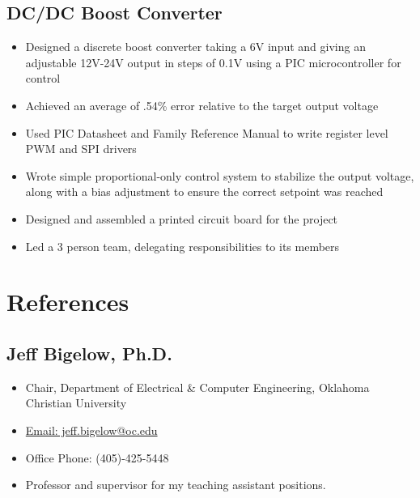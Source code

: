 \documentclass{article}
\begin{document}
\begin{spacing}{.5}
	\subsection{DC/DC Boost Converter \hfill {}}
		\begin{itemize}[label=--,itemsep=-.35ex]
			\item \large{Designed a discrete boost converter taking a 6V input and giving an adjustable 12V-24V output in steps of 0.1V using a PIC microcontroller for control}
			\item \large{Achieved an average of .54\% error relative to the target output voltage}
			\item \large{Used PIC Datasheet and Family Reference Manual to write register level PWM and SPI drivers}
			\item \large{Wrote simple proportional-only control system to stabilize the output voltage, along with a bias adjustment to ensure the correct setpoint was reached}
			\item \large{Designed and assembled a printed circuit board for the project}
			\item \large{Led a 3 person team, delegating responsibilities to its members}
		\end{itemize}

\section{References}
	\subsection{Jeff Bigelow, Ph.D.}
		\begin{itemize}[label=--,itemsep=-.35ex]
			\item \large{Chair, Department of Electrical \& Computer Engineering, Oklahoma Christian University}
			\item \large{\href{mailto::jeff.bigelow@oc.edu}{\large{Email: jeff.bigelow@oc.edu}}}
			\item \large{Office Phone: (405)-425-5448}
			\item \large{Professor and supervisor for my teaching assistant positions.}
		\end{itemize}

\end{spacing}
\end{document}
